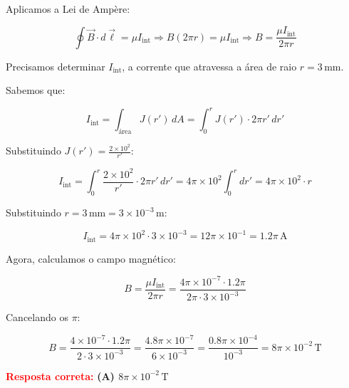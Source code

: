 \begin{flushleft}
\vspace{0.3cm}
Aplicamos a Lei de Amp\`ere:

\[
\oint \vec{B} \cdot d\vec{\ell} = \mu I_{\text{int}} \Rightarrow B(2\pi r) = \mu I_{\text{int}} \Rightarrow B = \frac{\mu I_{\text{int}}}{2\pi r}
\]

Precisamos determinar \( I_{\text{int}} \), a corrente que atravessa a área de raio \( r = 3\,\text{mm} \).

\vspace{0.3cm}
Sabemos que:

\[
I_{\text{int}} = \int_{\text{área}} J(r') \, dA = \int_0^r J(r') \cdot 2\pi r'\, dr'
\]

Substituindo \( J(r') = \frac{2 \times 10^2}{r'} \):

\[
I_{\text{int}} = \int_0^r \frac{2 \times 10^2}{r'} \cdot 2\pi r'\, dr' = 4\pi \times 10^2 \int_0^r dr' = 4\pi \times 10^2 \cdot r
\]

Substituindo \( r = 3\,\text{mm} = 3 \times 10^{-3}\,\text{m} \):

\[
I_{\text{int}} = 4\pi \times 10^2 \cdot 3 \times 10^{-3} = 12\pi \times 10^{-1} = 1.2\pi\,\text{A}
\]

\vspace{0.3cm}
Agora, calculamos o campo magnético:

\[
B = \frac{\mu I_{\text{int}}}{2\pi r} = \frac{4\pi \times 10^{-7} \cdot 1.2\pi}{2\pi \cdot 3 \times 10^{-3}}
\]

Cancelando os \(\pi\):

\[
B = \frac{4 \times 10^{-7} \cdot 1.2\pi}{2 \cdot 3 \times 10^{-3}} = \frac{4.8 \pi \times 10^{-7}}{6 \times 10^{-3}} = \frac{0.8\pi \times 10^{-4}}{10^{-3}} = 8\pi \times 10^{-2}\,\text{T}
\]

\vspace{0.5cm}
\textcolor{red}{\textbf{Resposta correta:}} \colorbox{green!30}{\textbf{(A) $8\pi \times 10^{-2} \, \text{T}$}}
\end{flushleft}

